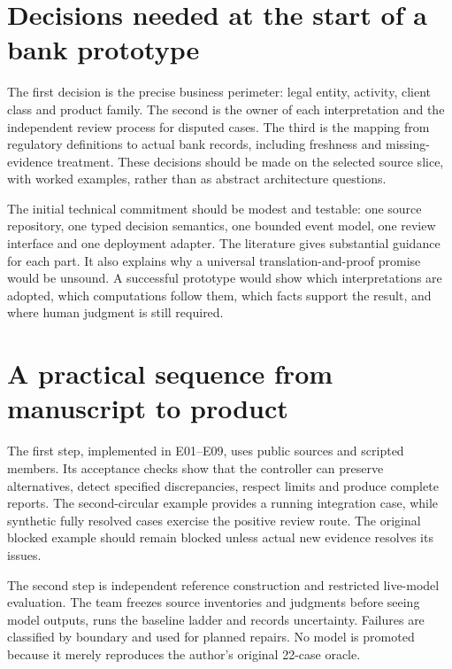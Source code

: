 \section{Decisions needed at the start of a bank prototype}
\label{merge:P-05-evidence:03}


The first decision is the precise business perimeter: legal entity, activity,
client class and product family. The second is the owner of each interpretation
and the independent review process for disputed cases. The third is the mapping
from regulatory definitions to actual bank records, including freshness and
missing-evidence treatment. These decisions should be made on the selected source
slice, with worked examples, rather than as abstract architecture questions.

The initial technical commitment should be modest and testable: one source
repository, one typed decision semantics, one bounded event model, one review
interface and one deployment adapter. The literature gives substantial guidance
for each part. It also explains why a universal translation-and-proof promise
would be unsound. A successful prototype would show which interpretations are
adopted, which computations follow them, which facts support the result, and where
human judgment is still required.

\section{A practical sequence from manuscript to product}
\label{merge:M10:14}


The first step, implemented in E01--E09, uses public sources and scripted
members. Its acceptance checks show that the controller can preserve alternatives, detect
specified discrepancies, respect limits and produce complete reports. The
second-circular example provides a running integration case, while synthetic
fully resolved cases exercise the positive review route. The original blocked
example should remain blocked unless actual new evidence resolves its issues.

The second step is independent reference construction and restricted live-model
evaluation. The team freezes source inventories and judgments before seeing
model outputs, runs the baseline ladder and records uncertainty. Failures are
classified by boundary and used for planned repairs. No model is promoted because
it merely reproduces the author's original 22-case oracle.

